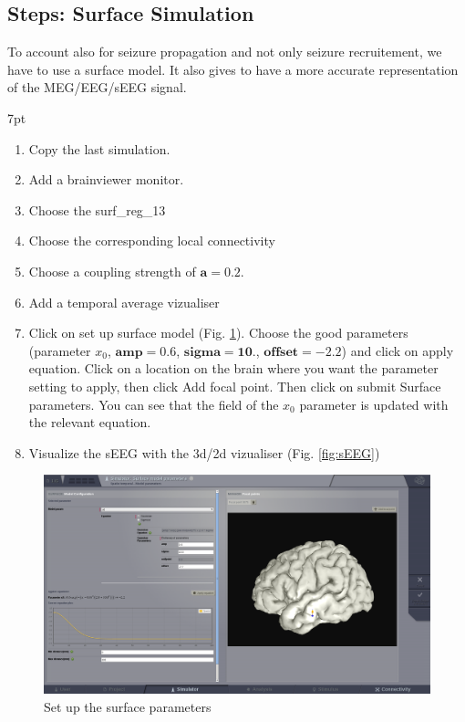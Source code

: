 \documentclass{tufte-handout}
\newenvironment{simulation}{%
  \def\FrameCommand{%
    \hspace{1pt}%
    {\color{ForestGreen}\vrule width 2pt}%
    {\color{simulationshade}\vrule width 4pt}%
    \colorbox{simulationshade}%
  }%
  \MakeFramed{\advance\hsize-\width\FrameRestore}%
  \noindent\hspace{-4.55pt}%
  \begin{adjustwidth}{}{7pt}%
  \vspace{2pt}\vspace{2pt}%
}
{%
  \vspace{2pt}\end{adjustwidth}\endMakeFramed%
}
\begin{document}
\subsection{Steps: Surface Simulation}

 To account also for seizure propagation and not only seizure recruitement, we have to use a surface model. 
 It also gives to have a more accurate representation of the MEG/EEG/sEEG signal.
 
  \begin{simulation}
  \begin{enumerate}
  \item Copy the last simulation.
  \item Add a brainviewer monitor.
  \item Choose the surf\_reg\_13
  \item Choose the corresponding local connectivity
  \item Choose  a coupling strength of $\mathbf{a=0.2}$.
  \item Add a temporal average vizualiser
  \item Click on set up surface model (Fig. \ref{fig:set_up_surface_parameters}). Choose the good parameters
  (parameter $x_0$, $\mathbf{amp=0.6}$, $\mathbf{sigma=10.}$, $\mathbf{offset=-2.2}$) and click on apply equation.
  Click on a location on the brain where you want the parameter setting to apply, then click Add focal point.
  Then click on submit Surface parameters. You can see that the field of the $x_0$ parameter is updated with
  the relevant equation.
  \item Visualize the sEEG with the 3d/2d vizualiser (Fig. \ref{fig:sEEG})
\end{enumerate}
\end{simulation}

\begin{figure}[h]
  \includegraphics[width=\linewidth]{Handout_UI_ModellingAnEpilepticPatient_SetUpSurfaceParameters}%
  \caption{Set up the surface parameters}%
  \label{fig:set_up_surface_parameters}%
\end{figure}
\end{document}
